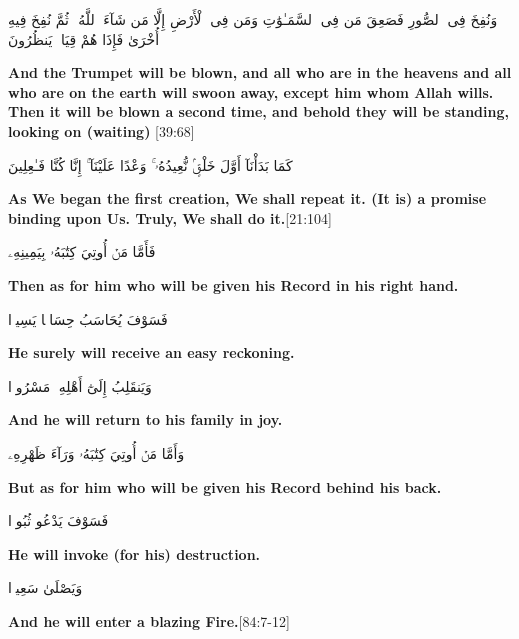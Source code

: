 \begin{center}
    \begin{RLtext}
        وَنُفِخَ فِى ٱلصُّورِ فَصَعِقَ مَن فِى ٱلسَّمَـٰوَٰتِ وَمَن فِى ٱلْأَرْضِ إِلَّا مَن شَآءَ ٱللَّهُ ۖ ثُمَّ نُفِخَ فِيهِ أُخْرَىٰ فَإِذَا هُمْ قِيَامٌۭ يَنظُرُونَ 
    \end{RLtext}
\end{center}
\textbf{And the Trumpet will be blown, and all who are in the heavens and all who are on the earth will swoon away, except him whom Allah wills. Then it will be blown a second time, and behold they will be standing, looking on (waiting)} [39:68]
\begin{center}
    \begin{RLtext}
        كَمَا بَدَأْنَآ أَوَّلَ خَلْقٍۢ نُّعِيدُهُۥ ۚ وَعْدًا عَلَيْنَآ ۚ إِنَّا كُنَّا فَـٰعِلِينَ
    \end{RLtext}
\end{center}
\textbf{As We began the first creation, We shall repeat it. (It is) a promise binding upon Us. Truly, We shall do it.}[21:104]
\begin{center}
    \begin{RLtext}
        فَأَمَّا مَنۡ أُوتِيَ كِتَٰبَهُۥ بِيَمِينِهِۦ
    \end{RLtext}
    \textbf{Then as for him who will be given his Record in his right hand.}
    \begin{RLtext}
        فَسَوْفَ يُحَاسَبُ حِسَابًۭا يَسِيرًۭا
    \end{RLtext}
    \textbf{He surely will receive an easy reckoning.}
    \begin{RLtext}
        وَيَنقَلِبُ إِلَىٰٓ أَهْلِهِۦ مَسْرُورًۭا 
    \end{RLtext}
    \textbf{And he will return to his family in joy.}
    \begin{RLtext}
        وَأَمَّا مَنۡ أُوتِيَ كِتَٰبَهُۥ وَرَآءَ ظَهْرِهِۦ
    \end{RLtext}
    \textbf{But as for him who will be given his Record behind his back.}
    \begin{RLtext}
        فَسَوْفَ يَدْعُو ثُبُورًۭا 
    \end{RLtext}
    \textbf{He will invoke (for his) destruction.}
    \begin{RLtext}
        وَيَصْلَىٰ سَعِيرًۭا 
    \end{RLtext}
    \textbf{And he will enter a blazing Fire.}[84:7-12]  
\end{center}


